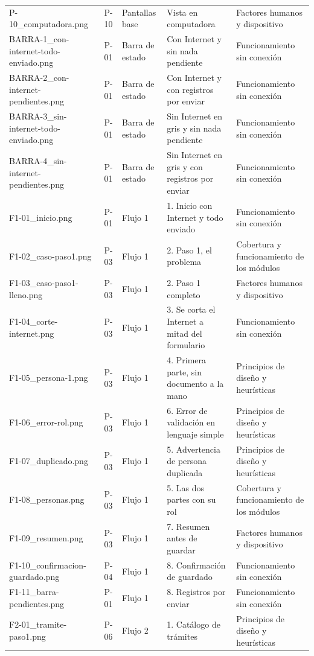 \begin{longtable}{@{}p{4.2cm}p{1.1cm}p{2.2cm}p{3.2cm}p{3.4cm}@{}}
P-10\_computadora.png & P-10 & Pantallas base & Vista en computadora & Factores humanos y dispositivo \\
BARRA-1\_con-internet-todo-enviado.png & P-01 & Barra de estado & Con Internet y sin nada pendiente & Funcionamiento sin conexión \\
BARRA-2\_con-internet-pendientes.png & P-01 & Barra de estado & Con Internet y con registros por enviar & Funcionamiento sin conexión \\
BARRA-3\_sin-internet-todo-enviado.png & P-01 & Barra de estado & Sin Internet en gris y sin nada pendiente & Funcionamiento sin conexión \\
BARRA-4\_sin-internet-pendientes.png & P-01 & Barra de estado & Sin Internet en gris y con registros por enviar & Funcionamiento sin conexión \\
F1-01\_inicio.png & P-01 & Flujo 1 & 1. Inicio con Internet y todo enviado & Funcionamiento sin conexión \\
F1-02\_caso-paso1.png & P-03 & Flujo 1 & 2. Paso 1, el problema & Cobertura y funcionamiento de los módulos \\
F1-03\_caso-paso1-lleno.png & P-03 & Flujo 1 & 2. Paso 1 completo & Factores humanos y dispositivo \\
F1-04\_corte-internet.png & P-03 & Flujo 1 & 3. Se corta el Internet a mitad del formulario & Funcionamiento sin conexión \\
F1-05\_persona-1.png & P-03 & Flujo 1 & 4. Primera parte, sin documento a la mano & Principios de diseño y heurísticas \\
F1-06\_error-rol.png & P-03 & Flujo 1 & 6. Error de validación en lenguaje simple & Principios de diseño y heurísticas \\
F1-07\_duplicado.png & P-03 & Flujo 1 & 5. Advertencia de persona duplicada & Principios de diseño y heurísticas \\
F1-08\_personas.png & P-03 & Flujo 1 & 5. Las dos partes con su rol & Cobertura y funcionamiento de los módulos \\
F1-09\_resumen.png & P-03 & Flujo 1 & 7. Resumen antes de guardar & Factores humanos y dispositivo \\
F1-10\_confirmacion-guardado.png & P-04 & Flujo 1 & 8. Confirmación de guardado & Funcionamiento sin conexión \\
F1-11\_barra-pendientes.png & P-01 & Flujo 1 & 8. Registros por enviar & Funcionamiento sin conexión \\
F2-01\_tramite-paso1.png & P-06 & Flujo 2 & 1. Catálogo de trámites & Principios de diseño y heurísticas \\

\end{longtable}
